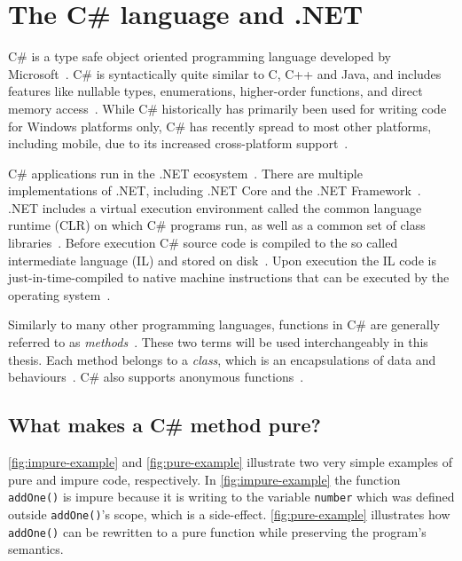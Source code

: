 \documentclass[a4paper,12pt]{article}
\begin{document}
\section{The C\# language and .NET} \label{sub:the-csharp-language}
C\# is a type safe object oriented programming language developed by Microsoft~\cite{albahari2003nutshell}. C\# is syntactically quite similar to C, C++ and Java, and includes features like nullable types, enumerations, higher-order functions, and direct memory access~\cite{intro-to-Csharp}. While C\# historically has primarily been used for writing code for Windows platforms only, C\# has recently spread to most other platforms, including mobile, due to its increased cross-platform support~\cite{albahari2003nutshell}.

C\# applications run in the .NET ecosystem~\cite{intro-to-Csharp}. There are multiple implementations of .NET, including .NET Core and the .NET Framework~\cite{intro-to-Csharp}. .NET includes a virtual execution environment called the common language runtime (CLR) on which C\# programs run, as well as a common set of class libraries~\cite{albahari2003nutshell}. Before execution C\# source code is compiled to the so called intermediate language (IL) and stored on disk~\cite{intro-to-Csharp}. Upon execution the IL code is just-in-time-compiled to native machine instructions that can be executed by the operating system~\cite{intro-to-Csharp}.

Similarly to many other programming languages, functions in C\# are generally referred to as \textit{methods}~\cite{albahari2003nutshell}. These two terms will be used interchangeably in this thesis. Each method belongs to a \textit{class}, which is an encapsulations of data and behaviours~\cite{albahari2003nutshell}. C\# also supports anonymous functions~\cite{albahari2003nutshell}.

\subsection{What makes a C\# method pure?} \label{sub:What makes a Cs program functional?}
\autoref{fig:impure-example} and \autoref{fig:pure-example} illustrate two very simple examples of pure and impure code, respectively. In \autoref{fig:impure-example} the function \texttt{addOne()} is impure because it is writing to the variable \texttt{number} which was defined outside \texttt{addOne()}'s scope, which is a side-effect. \autoref{fig:pure-example} illustrates how \texttt{addOne()} can be rewritten to a pure function while preserving the program's semantics.
\end{document}
